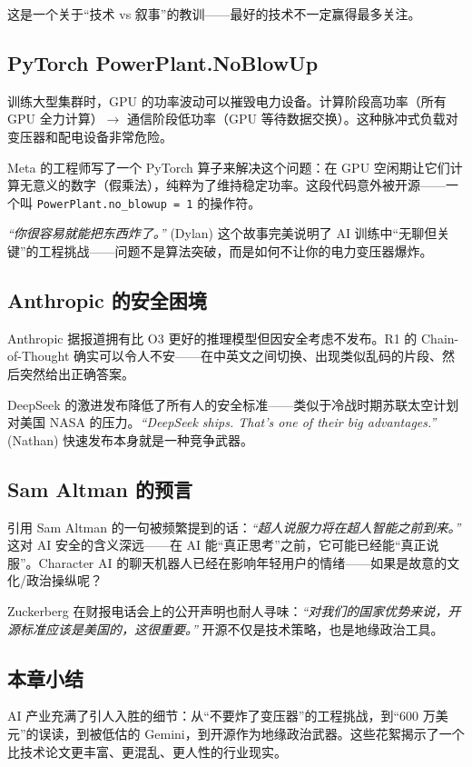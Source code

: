 \documentclass[a4paper]{article}
\begin{document}
这是一个关于``技术 vs 叙事''的教训——最好的技术不一定赢得最多关注。

\subsection{PyTorch PowerPlant.NoBlowUp}

训练大型集群时，GPU 的功率波动可以摧毁电力设备。计算阶段高功率（所有 GPU 全力计算）$\to$ 通信阶段低功率（GPU 等待数据交换）。这种脉冲式负载对变压器和配电设备非常危险。

Meta 的工程师写了一个 PyTorch 算子来解决这个问题：在 GPU 空闲期让它们计算无意义的数字（假乘法），纯粹为了维持稳定功率。这段代码意外被开源——一个叫 \texttt{PowerPlant.no\_blowup = 1} 的操作符。

\textit{``你很容易就能把东西炸了。''} (Dylan) 这个故事完美说明了 AI 训练中``无聊但关键''的工程挑战——问题不是算法突破，而是如何不让你的电力变压器爆炸。

\subsection{Anthropic 的安全困境}

Anthropic 据报道拥有比 O3 更好的推理模型但因安全考虑不发布。R1 的 Chain-of-Thought 确实可以令人不安——在中英文之间切换、出现类似乱码的片段、然后突然给出正确答案。

DeepSeek 的激进发布降低了所有人的安全标准——类似于冷战时期苏联太空计划对美国 NASA 的压力。\textit{``DeepSeek ships. That's one of their big advantages.''} (Nathan) 快速发布本身就是一种竞争武器。

\subsection{Sam Altman 的预言}

引用 Sam Altman 的一句被频繁提到的话：\textit{``超人说服力将在超人智能之前到来。''} 这对 AI 安全的含义深远——在 AI 能``真正思考''之前，它可能已经能``真正说服''。Character AI 的聊天机器人已经在影响年轻用户的情绪——如果是故意的文化/政治操纵呢？

Zuckerberg 在财报电话会上的公开声明也耐人寻味：\textit{``对我们的国家优势来说，开源标准应该是美国的，这很重要。''} 开源不仅是技术策略，也是地缘政治工具。

\subsection{本章小结}

AI 产业充满了引人入胜的细节：从``不要炸了变压器''的工程挑战，到``600 万美元''的误读，到被低估的 Gemini，到开源作为地缘政治武器。这些花絮揭示了一个比技术论文更丰富、更混乱、更人性的行业现实。
\end{document}
